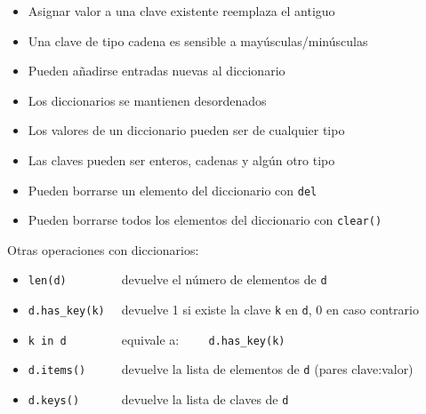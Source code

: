 \documentclass[ucs]{beamer}
\begin{document}


\begin{frame}[fragile]

  \begin{itemize}
  \item Asignar valor a una clave existente reemplaza el antiguo 
  \item Una clave de tipo cadena es sensible a mayúsculas/minúsculas
  \item Pueden añadirse entradas nuevas al diccionario
  \item Los diccionarios se mantienen desordenados
\item Los valores de un diccionario pueden ser de cualquier tipo
\item Las claves pueden ser enteros, cadenas y algún otro tipo
\item Pueden borrarse un elemento del diccionario con \verb|del|
\item Pueden borrarse todos los elementos del diccionario con \verb|clear()|
\end{itemize}

\end{frame}




\begin{frame}[fragile]
Otras operaciones con diccionarios:
\begin{scriptsize}
  \begin{itemize}
  \item \verb|len(d)        | devuelve el número de elementos de \verb|d|
  \item \verb|d.has_key(k)  | devuelve 1 si existe la clave \verb|k| en
    \verb|d|, 0 en caso contrario
  \item \verb|k in d        | equivale a: \verb|    d.has_key(k)|
  \item \verb|d.items()     | devuelve la lista de elementos de \verb|d| 
(pares clave:valor)
  \item \verb|d.keys()      | devuelve la lista de claves de \verb|d|
  \end{itemize}
\end{scriptsize}
\end{frame}
\end{document}
